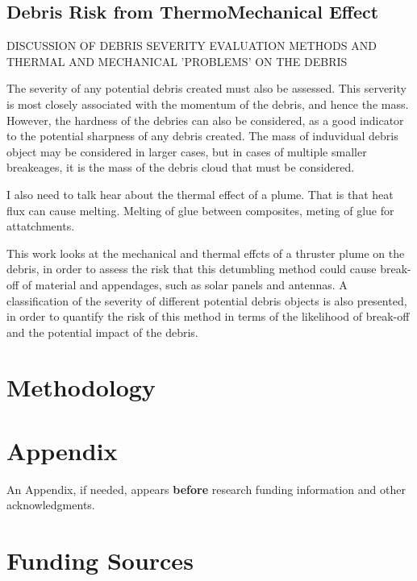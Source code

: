 \documentclass[journal]{new-aiaa}
\begin{document}
\subsection{Debris Risk from ThermoMechanical Effect}

DISCUSSION OF DEBRIS SEVERITY EVALUATION METHODS
AND THERMAL AND MECHANICAL 'PROBLEMS' ON THE DEBRIS


The severity of any potential debris created must also be assessed. This serverity is most closely associated with the momentum of the debris, and hence the mass. However, the hardness of the debries can also be considered, as a good indicator to the potential sharpness of any debris created. The mass of induvidual debris object may be considered in larger cases, but in cases of multiple smaller breakeages, it is the mass of the debris cloud that must be considered. 



I also need to talk hear about the thermal effect of a plume. That is that heat flux can cause melting. Melting of glue between composites, meting of glue for attatchments. 


This work looks at the mechanical and thermal effcts of a thruster plume on the debris, in order to assess the risk that this detumbling method could cause break-off of material and appendages, such as solar panels and antennas. A classification of the severity of different potential debris objects is also presented, in order to quantify the risk of this method in terms of the likelihood of break-off and the potential impact of the debris.




\section{Methodology}
\label{sec-methodolody}



\section*{Appendix}

An Appendix, if needed, appears \textbf{before} research funding information and other acknowledgments.

\section*{Funding Sources}
\end{document}
